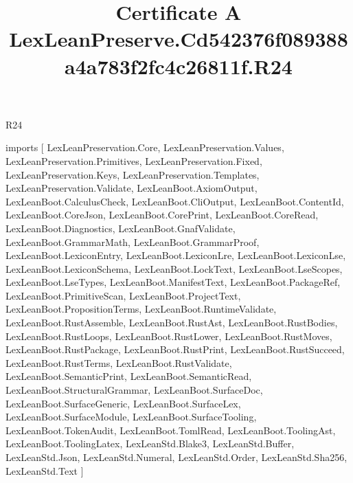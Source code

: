 \begin{lexlean}{R24}
\title{Certificate A LexLeanPreserve.Cd542376f089388a4a783f2fc4c26811f.R24}
\begin{coremodule}
imports [
  LexLeanPreservation.Core,
  LexLeanPreservation.Values,
  LexLeanPreservation.Primitives,
  LexLeanPreservation.Fixed,
  LexLeanPreservation.Keys,
  LexLeanPreservation.Templates,
  LexLeanPreservation.Validate,
  LexLeanBoot.AxiomOutput,
  LexLeanBoot.CalculusCheck,
  LexLeanBoot.CliOutput,
  LexLeanBoot.ContentId,
  LexLeanBoot.CoreJson,
  LexLeanBoot.CorePrint,
  LexLeanBoot.CoreRead,
  LexLeanBoot.Diagnostics,
  LexLeanBoot.GnafValidate,
  LexLeanBoot.GrammarMath,
  LexLeanBoot.GrammarProof,
  LexLeanBoot.LexiconEntry,
  LexLeanBoot.LexiconLre,
  LexLeanBoot.LexiconLse,
  LexLeanBoot.LexiconSchema,
  LexLeanBoot.LockText,
  LexLeanBoot.LseScopes,
  LexLeanBoot.LseTypes,
  LexLeanBoot.ManifestText,
  LexLeanBoot.PackageRef,
  LexLeanBoot.PrimitiveScan,
  LexLeanBoot.ProjectText,
  LexLeanBoot.PropositionTerms,
  LexLeanBoot.RuntimeValidate,
  LexLeanBoot.RustAssemble,
  LexLeanBoot.RustAst,
  LexLeanBoot.RustBodies,
  LexLeanBoot.RustLoops,
  LexLeanBoot.RustLower,
  LexLeanBoot.RustMoves,
  LexLeanBoot.RustPackage,
  LexLeanBoot.RustPrint,
  LexLeanBoot.RustSucceed,
  LexLeanBoot.RustTerms,
  LexLeanBoot.RustValidate,
  LexLeanBoot.SemanticPrint,
  LexLeanBoot.SemanticRead,
  LexLeanBoot.StructuralGrammar,
  LexLeanBoot.SurfaceDoc,
  LexLeanBoot.SurfaceGeneric,
  LexLeanBoot.SurfaceLex,
  LexLeanBoot.SurfaceModule,
  LexLeanBoot.SurfaceTooling,
  LexLeanBoot.TokenAudit,
  LexLeanBoot.TomlRead,
  LexLeanBoot.ToolingAst,
  LexLeanBoot.ToolingLatex,
  LexLeanStd.Blake3,
  LexLeanStd.Buffer,
  LexLeanStd.Json,
  LexLeanStd.Numeral,
  LexLeanStd.Order,
  LexLeanStd.Sha256,
  LexLeanStd.Text
]


\end{coremodule}
\end{lexlean}
